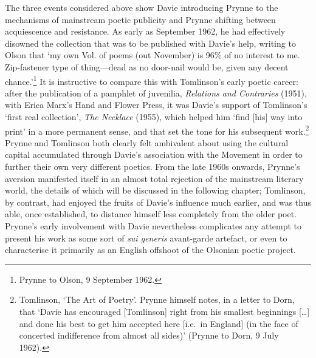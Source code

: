 \documentclass[]{article}
\begin{document}
The three events considered above show Davie introducing Prynne to the
mechanisms of mainstream poetic publicity and Prynne shifting between
acquiescence and resistance. As early as September 1962, he had
effectively disowned the collection that was to be published with
Davie's help, writing to Olson that `my own Vol. of poems (out November)
is 96\% of no interest to me. Zip-fastener type of thing---dead as no
door-nail would be, given any decent chance.'\footnote{Prynne to Olson,
  9 September 1962.} It is instructive to compare this with Tomlinson's
early poetic career: after the publication of a pamphlet of juvenilia,
\emph{Relations and Contraries} (1951), with Erica Marx's Hand and
Flower Press, it was Davie's support of Tomlinson's `first real
collection', \emph{The Necklace} (1955), which helped him `find
{[}his{]} way into print' in a more permanent sense, and that set the
tone for his subsequent work.\footnote{Tomlinson, `The Art of Poetry'.
  Prynne himself notes, in a letter to Dorn, that `Davie has encouraged
  {[}Tomlinson{]} right from his smallest beginnings {[}\ldots{}{]} and
  done his best to get him accepted here {[}i.e.~in England{]} (in the
  face of concerted indifference from almost all sides)' (Prynne to
  Dorn, 9 July 1962).} Prynne and Tomlinson both clearly felt ambivalent
about using the cultural capital accumulated through Davie's association
with the Movement in order to further their own very different poetics.
From the late 1960s onwards, Prynne's aversion manifested itself in an
almost total rejection of the mainstream literary world, the details of
which will be discussed in the following chapter; Tomlinson, by
contrast, had enjoyed the fruits of Davie's influence much earlier, and
was thus able, once established, to distance himself less completely
from the older poet. Prynne's early involvement with Davie nevertheless
complicates any attempt to present his work as some sort of \emph{sui
generis} avant-garde artefact, or even to characterise it primarily as
an English offshoot of the Olsonian poetic project.
\end{document}
